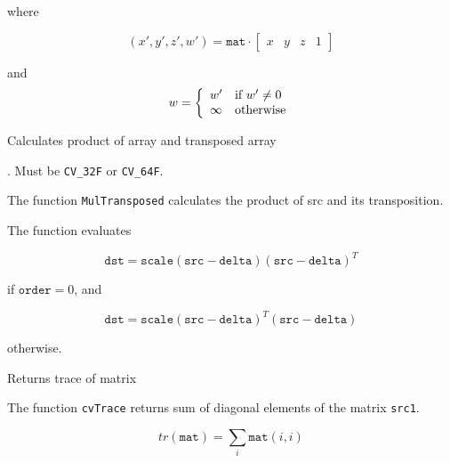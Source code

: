 where

\[ (x', y', z', w') = \texttt{mat} \cdot
\begin{bmatrix}
x & y & z & 1
\end{bmatrix}
\]

and
\[ w = \left\{ \begin{array}{l l} w' & \mbox{if $w' \ne 0$}\\ \infty & \mbox{otherwise}\\ \end{array} \right. \]

\label{MulTransposed}

Calculates product of array and transposed array


\begin{description}
. Must be \texttt{CV\_32F} or \texttt{CV\_64F}.
\end{description}

The function \texttt{MulTransposed} calculates the product of src and its transposition.

The function evaluates

\[
\texttt{dst}=\texttt{scale} (\texttt{src}-\texttt{delta}) (\texttt{src}-\texttt{delta})^T
\]

if $\texttt{order}=0$, and

\[
\texttt{dst}=\texttt{scale} (\texttt{src}-\texttt{delta})^T (\texttt{src}-\texttt{delta})
\]

otherwise.

\label{Trace}

Returns trace of matrix


\begin{description}
\end{description}


The function \texttt{cvTrace} returns sum of diagonal elements of the matrix \texttt{src1}.

\[ tr(\texttt{mat}) = \sum_i \texttt{mat}(i,i) \]

\label{Transpose}

